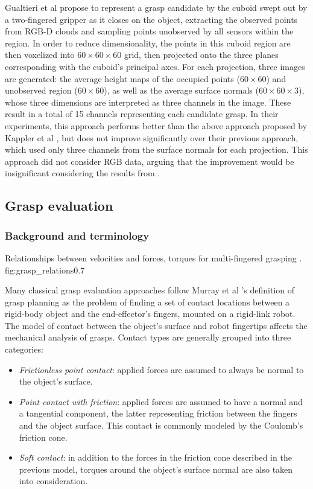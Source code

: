 Gualtieri et al \cite{Gualtieri2016} propose to represent a grasp candidate by the cuboid swept out by a two-fingered
gripper as it closes on the object, extracting the observed points from RGB-D clouds and sampling points unobserved by
all sensors within the region. In order to reduce dimensionality, the points in this cuboid region are then voxelized
into $60 \times 60 \times 60$ grid, then projected onto the three planes corresponding with the cuboid's principal axes.
For each projection, three images are generated: the average height maps of the occupied points ($60 \times 60$) and
unobserved region ($60 \times 60$), as well as the average surface normals ($60 \times 60 \times 3$), whose three
dimensions are interpreted as three channels in the image. These result in a total of 15 channels representing each
candidate grasp. In their experiments, this approach performs better than the above approach proposed by Kappler et al
\cite{Kappler2015}, but does not improve significantly over their previous approach, which used only three channels from
the surface normals for each projection. This approach did not consider RGB data, arguing that the improvement would be
insignificant considering the results from \cite{lenz2015}.

\subsection{Grasp evaluation}

\subsubsection*{Background and terminology}
             {Relationships between velocities and forces, torques for multi-fingered grasping \cite{Roa2015}.}
             {fig:grasp_relations}{0.7\textwidth}

Many classical grasp evaluation approaches follow Murray et al \cite{Murray1994}'s definition of grasp planning as the
problem of finding a set of contact locations between a rigid-body object and the end-effector's fingers, mounted on a
rigid-link robot. The model of contact between the object's surface and robot fingertips affects the mechanical analysis
of grasps. Contact types are generally grouped into three categories:
\begin{itemize}
    \item \emph{Frictionless point contact}: applied forces are assumed to always be normal to the object's surface.
    \item \emph{Point contact with friction}: applied forces are assumed to have a normal and a tangential component,
    the latter representing friction between the fingers and the object surface. This contact is commonly modeled by the
    Coulomb's friction cone.
    \item \emph{Soft contact}: in addition to the forces in the friction cone described in the previous model, torques
    around the object's surface normal are also taken into consideration.
\end{itemize}

